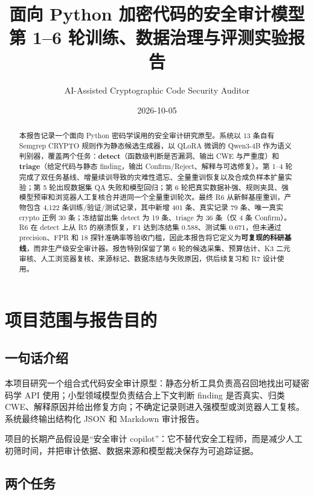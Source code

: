 \documentclass[UTF8,11pt,fontset=none]{ctexart}
\title{\bfseries 面向 Python 加密代码的安全审计模型\\
\large 第 1--6 轮训练、数据治理与评测实验报告}
\author{AI-Assisted Cryptographic Code Security Auditor}
\date{2026-10-05}
\begin{document}
\maketitle
\vspace{-1.2em}

\begin{abstract}
\noindent 本报告记录一个面向 Python 密码学误用的安全审计研究原型。系统以 13 条自有 Semgrep CRYPTO 规则作为静态候选生成器，以 QLoRA 微调的 Qwen3-4B 作为语义判别器，覆盖两个任务：\textbf{detect}（函数级判断是否漏洞、输出 CWE 与严重度）和 \textbf{triage}（给定代码与静态 finding，输出 Confirm/Reject、解释与可选修复）。第 1--4 轮完成了双任务基线、增量续训导致的灾难性遗忘、全量重训恢复以及合成负样本扩量实验；第 5 轮出现数据集 QA 失败和模型回归；第 6 轮把真实数据补强、规则夹具、强模型预审和浏览器人工复核合并进同一个全量重训轮次。最终 R6 从新鲜基座重训，产物包含 4,122 条训练/验证/测试记录，其中新增 401 条、真实记录 79 条、唯一真实 crypto 正例 30 条；冻结留出集 detect 为 19 条、triage 为 36 条（仅 4 条 Confirm）。R6 在 detect 上从 R5 的崩溃恢复，F1 达到冻结集 0.588、测试集 0.671，但未通过 precision、FPR 和 18 探针准确率等验收门槛，因此本报告将它定义为\textbf{可复现的科研基线}，而非生产级安全审计器。报告特别保留了第 6 轮的候选采集、预算估计、K3 二元审核、人工浏览器复核、来源标记、数据冻结与失败原因，供后续复习和 R7 设计使用。
\end{abstract}

\tableofcontents

\section{项目范围与报告目的}

\subsection{一句话介绍}

本项目研究一个组合式代码安全审计原型：静态分析工具负责高召回地找出可疑密码学 API 使用；小型领域模型负责结合上下文判断 finding 是否真实、归类 CWE、解释原因并给出修复方向；不确定记录则进入强模型或浏览器人工复核。系统最终输出结构化 JSON 和 Markdown 审计报告。

项目的长期产品假设是“安全审计 copilot”：它不替代安全工程师，而是减少人工初筛时间，并把审计依据、数据来源和模型裁决保存为可追踪证据。

\subsection{两个任务}
\end{document}
